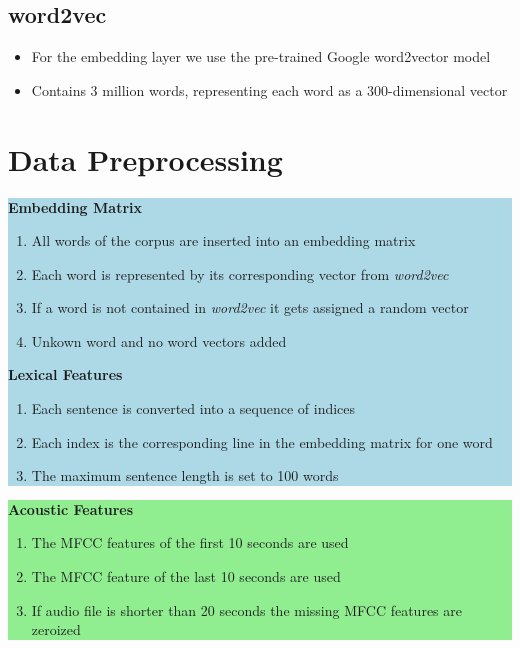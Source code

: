 \documentclass[a0,landscape]{a0poster}
\begin{document}
\begin{multicols}{3}
\subsection*{word2vec}
\begin{itemize}
	\item For the embedding layer we use the pre-trained Google word2vector model
	\item Contains 3 million words, representing each word as a 300-dimensional vector
\end{itemize}

\large
\section*{Data Preprocessing}
\colorbox{lightblue}{
	\parbox{1025pt}{
		\vspace{0.5cm}
		{\Large \textbf{Embedding Matrix}}
		\begin{enumerate}
			\item All words of the corpus are inserted into an embedding matrix
			\item Each word is represented by its corresponding vector from \textit{word2vec}
			\item If a word is not contained in \textit{word2vec} it gets assigned a random vector
			\item Unkown word and no word vectors added
		\end{enumerate}
		\vspace{0.5cm}
		{\Large \textbf{Lexical Features}}
		\begin{enumerate}	
			\item Each sentence is converted into a sequence of indices
			\item Each index is the corresponding line in the embedding matrix for one word
			\item The maximum sentence length is set to 100 words
		\end{enumerate}
}}
\colorbox{lightgreen}{
	\parbox{1025pt}{
		\vspace{0.5cm}
		{\Large \textbf{Acoustic Features}}
		\begin{enumerate}
			\item The MFCC features of the first 10 seconds are used
			\item The MFCC feature of the last 10 seconds are used 
			\item If audio file is shorter than 20 seconds the missing MFCC features are zeroized
		\end{enumerate}
	}}


\end{multicols}
\end{document}
